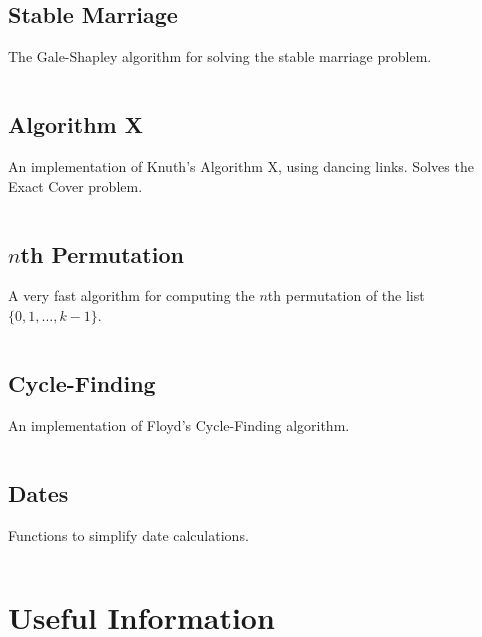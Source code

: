 \documentclass[9pt,a4paper,twocolumn,landscape,oneside]{amsart}
\newcommand{\code}[1]{\inputminted{cpp}{_code/#1}}
\begin{document}
    \subsection{Stable Marriage}
        The Gale-Shapley algorithm for solving the stable marriage problem.
        \code{other/stable_marriage.cpp}

    \subsection{Algorithm X}
        An implementation of Knuth's Algorithm X, using dancing links. Solves the Exact Cover problem.
        \code{other/algorithm_x.cpp}

    \subsection{$n$th Permutation}
        A very fast algorithm for computing the $n$th permutation of the list
        $\{0,1,\ldots,k-1\}$.
        \code{other/nth_permutation.cpp}

    \subsection{Cycle-Finding}
        An implementation of Floyd's Cycle-Finding algorithm.
        \code{other/floyds_algorithm.cpp}

    \subsection{Dates}
        Functions to simplify date calculations.
        \code{other/dates.cpp}


\section{Useful Information}
\end{document}
